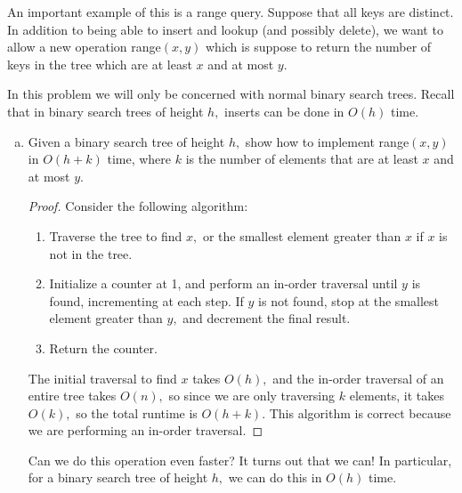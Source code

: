 \documentclass{article}
\begin{document}
An important example of this is a range query. Suppose that all keys are distinct. In addition to being able to insert and lookup (and possibly delete), we want to allow a new operation range$(x, y)$ which is suppose to return the number of keys in the tree which are at least $x$ and at most $y.$

In this problem we will only be concerned with normal binary search trees. Recall that in binary search trees of height $h,$ inserts can be done in $O(h)$ time.
\begin{enumerate}[(a)]
	\item Given a binary search tree of height $h,$ show how to implement range$(x, y)$ in $O(h+k)$ time, where $k$ is the number of elements that are at least $x$ and at most $y.$
		\begin{proof}
			Consider the following algorithm:
			\begin{enumerate}[(1)]
				\item Traverse the tree to find $x,$ or the smallest element greater than $x$ if $x$ is not in the tree.
				\item Initialize a counter at 1, and perform an in-order traversal until $y$ is found, incrementing at each step. If $y$ is not found, stop at the smallest element greater than $y,$ and decrement the final result.
				\item Return the counter.
			\end{enumerate}
			
			The initial traversal to find $x$ takes $O(h),$ and the in-order traversal of an entire tree takes $O(n),$ so since we are only traversing $k$ elements, it takes $O(k),$ so the total runtime is $O(h+k).$ This algorithm is correct because we are performing an in-order traversal.
		\end{proof}

	Can we do this operation even faster? It turns out that we can! In particular, for a binary search tree of height $h,$ we can do this in $O(h)$ time. 


\end{enumerate}
\end{document}
